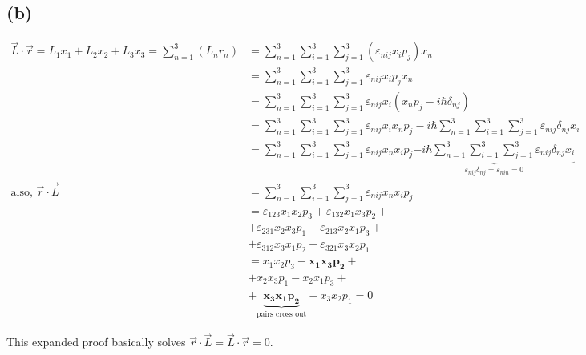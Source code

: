 \documentclass[letter, 10pts]{article}
\newcommand{\hb}{\hbar}
\begin{document}
\subsection*{(b)} 
\begin{align*}
\vec{L} \cdot  \vec{r} = L_1 x_1 + L_2 x_2 + L_3 x_3 = \sum_{n=1}^{3} (L_n r_n) 
&= \sum_{n=1}^{3} 
\sum_{i = 1}^{3} \sum_{j = 1}^{3} 
(\varepsilon_{n i j } x_i p_j ) x_n  \\ 
&= \sum_{n=1}^{3} 
\sum_{i = 1}^{3} \sum_{j = 1}^{3} 
\varepsilon_{n i j } x_i p_j  x_n  \\ 
&= \sum_{n=1}^{3} 
\sum_{i = 1}^{3} \sum_{j = 1}^{3} 
\varepsilon_{n i j } x_i (x_n p_j - i \hb \delta_{n j} )  \\ 
&= \sum_{n=1}^{3}
\sum_{i = 1}^{3} \sum_{j = 1}^{3} 
\varepsilon_{n i j } x_i x_n p_j - i \hb 
\sum_{n=1}^{3} 
\sum_{i = 1}^{3} \sum_{j = 1}^{3} 
\varepsilon_{nij } \delta_{n j} x_i    \\ 
&= \sum_{n=1}^{3}
\sum_{i = 1}^{3} \sum_{j = 1}^{3} 
\varepsilon_{n i j } x_n x_i p_j 
\underbrace{- i \hb 
\sum_{n=1}^{3} 
\sum_{i = 1}^{3} \sum_{j = 1}^{3} 
\varepsilon_{nij } \delta_{n j} x_i }_{\varepsilon_{nij} \delta_{nj} = \varepsilon_{nin} = 0}   \\ 
\text{also, } \vec{r} \cdot  \vec{L} &= \sum_{n=1}^{3}
\sum_{i = 1}^{3} \sum_{j = 1}^{3} 
\varepsilon_{n i j } x_n x_i p_j  \\
&= \varepsilon_{123} x_1 x_2 p_3 + \varepsilon_{132} x_1 x_3 p_2 + \\
&+ \varepsilon_{231} x_2 x_3 p_1 + \varepsilon_{213} x_2 x_1 p_3 + \\ 
&+ \varepsilon_{312} x_3 x_1 p_2 + \varepsilon_{321} x_3 x_2 p_1  \\ 
&= x_1 x_2 p_3 -  \mathbf{x_1 x_3 p_2} + \\
&+  x_2 x_3 p_1 -  x_2 x_1 p_3 + \\ 
&+  \underbrace{\mathbf{x_3 x_1 p_2}}_{\text{pairs cross out}} -  x_3 x_2 p_1  = 0
\end{align*}

This expanded proof basically solves $\vec{r} \cdot \vec{L} = \vec{L} \cdot \vec{r} = 0$. 
\end{document}
